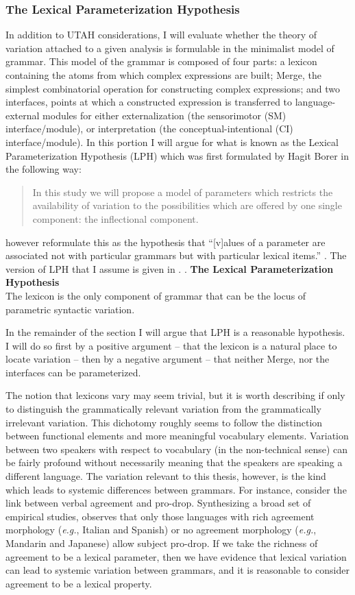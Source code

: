 \documentclass[MilwayThesis]{subfiles}
\begin{document}
\subsubsection{The Lexical Parameterization Hypothesis}
In addition to UTAH considerations, I will evaluate whether the theory of variation attached to a given analysis is formulable in the minimalist model of grammar.
This model of the grammar is composed of four parts:
	a lexicon containing the atoms from which complex expressions are built;
	Merge, the simplest combinatorial operation for constructing complex expressions; 
	and two interfaces, points at which a constructed expression is transferred to language-external modules for either externalization (the sensorimotor (SM) interface/module), or interpretation (the conceptual-intentional (CI) interface/module).
In this portion I will argue for what is known as the Lexical Parameterization Hypothesis (LPH) which was first formulated by Hagit Borer in the following way:
\begin{quote}
	In this study we will propose a model of parameters which restricts the availability of variation to the possibilities which are offered by one single component: the inflectional component. \parencite[3]{borer1984parametric}
\end{quote}
\textcite{manzini1987parameters} however reformulate this as the hypothesis that ``[v]alues of a parameter are associated not with particular grammars but with particular lexical items.'' \parencite[424]{manzini1987parameters}.
The version of LPH that I assume is given in \Next.
\ex. \textbf{The Lexical Parameterization Hypothesis}\\
The lexicon is the only component of grammar that can be the locus of parametric syntactic variation.

In the remainder of the section I will argue that LPH is a reasonable hypothesis.
I will do so first by a positive argument -- that the lexicon is a natural place to locate variation -- then by a negative argument -- that neither Merge, nor the interfaces can be parameterized.

The notion that lexicons vary may seem trivial, but it is worth describing if only to distinguish the grammatically relevant variation from the grammatically irrelevant variation.
This dichotomy roughly seems to follow the distinction between functional elements and more meaningful vocabulary elements.
Variation between two speakers with respect to vocabulary (in the non-technical sense) can be fairly profound without necessarily meaning that the speakers are speaking a different language.
The variation relevant to this thesis, however, is the kind which leads to systemic differences between grammars.
For instance, consider the link between verbal agreement and pro-drop.
Synthesizing a broad set of empirical studies, \textcite{huang1984distribution} observes that only those languages with rich agreement morphology (\textit{e.g.}, Italian and Spanish) or no agreement morphology (\textit{e.g.}, Mandarin and Japanese) allow subject pro-drop.
If we take the richness of agreement to be a lexical parameter, then we have evidence that lexical variation can lead to systemic variation between grammars, and it is reasonable to consider agreement to be a lexical property.
\end{document}
